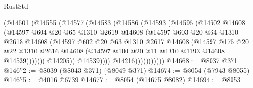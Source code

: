 \begin{lexlean}{RustStd}
\begin{coremodule}
                          (@14501
                            (@14555
                              (@14577
                                (@14583
                                  (@14586
                                    (@14593
                                      (@14596
                                        (@14602
                                          @14608
                                          (@14597
                                            @604
                                            @20
                                            @65
                                            @1310
                                            @2619
                                            @14608
                                            (@14597
                                              @603
                                              @20
                                              @64
                                              @1310
                                              @2618
                                              @14608
                                              (@14597
                                                @602
                                                @20
                                                @63
                                                @1310
                                                @2617
                                                @14608
                                                (@14597
                                                  @175
                                                  @20
                                                  @22
                                                  @1310
                                                  @2616
                                                  @14608
                                                  (@14597
                                                    @100
                                                    @20
                                                    @11
                                                    @1310
                                                    @1193
                                                    @14608
                                                    @14539)))))))
                                      @14205))
                                  @14539))))
                          @14216)))))))))))
@14668 := @8037 @371
@14672 := @8039 (@8043 @371) (@8049 @371)
@14674 := @8054 (@7943 @8055)
@14675 := @4016 @6739
@14677 := @8054 (@14675 @8082)
@14694 := @8053

\end{coremodule}
\end{lexlean}
